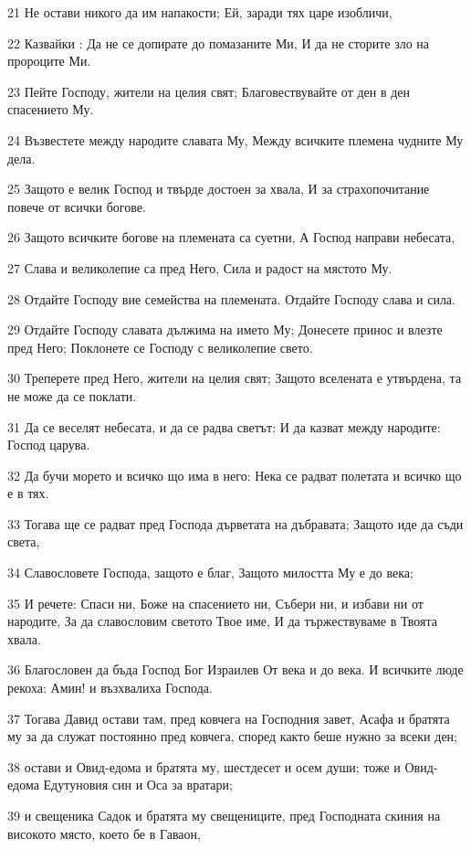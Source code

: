 \par 21 Не остави никого да им напакости; Ей, заради тях царе изобличи,
\par 22 Казвайки : Да не се допирате до помазаните Ми, И да не сторите зло на пророците Ми.
\par 23 Пейте Господу, жители на целия свят; Благовествувайте от ден в ден спасението Му.
\par 24 Възвестете между народите славата Му, Между всичките племена чудните Му дела.
\par 25 Защото е велик Господ и твърде достоен за хвала, И за страхопочитание повече от всички богове.
\par 26 Защото всичките богове на племената са суетни, А Господ направи небесата,
\par 27 Слава и великолепие са пред Него, Сила и радост на мястото Му.
\par 28 Отдайте Господу вие семейства на племената. Отдайте Господу слава и сила.
\par 29 Отдайте Господу славата дължима на името Му; Донесете принос и влезте пред Него; Поклонете се Господу с великолепие свето.
\par 30 Треперете пред Него, жители на целия свят; Защото вселената е утвърдена, та не може да се поклати.
\par 31 Да се веселят небесата, и да се радва светът: И да казват между народите: Господ царува.
\par 32 Да бучи морето и всичко що има в него: Нека се радват полетата и всичко що е в тях.
\par 33 Тогава ще се радват пред Господа дърветата на дъбравата; Защото иде да съди света,
\par 34 Славословете Господа, защото е благ, Защото милостта Му е до века;
\par 35 И речете: Спаси ни, Боже на спасението ни, Събери ни, и избави ни от народите, За да славословим светото Твое име, И да тържествуваме в Твоята хвала.
\par 36 Благословен да бъда Господ Бог Израилев От века и до века. И всичките люде рекоха: Амин! и възхвалиха Господа.
\par 37 Тогава Давид остави там, пред ковчега на Господния завет, Асафа и братята му за да служат постоянно пред ковчега, според както беше нужно за всеки ден;
\par 38 остави и Овид-едома и братята му, шестдесет и осем души; тоже и Овид-едома Едутуновия син и Оса за вратари;
\par 39 и свещеника Садок и братята му свещениците, пред Господната скиния на високото място, което бе в Гаваон,
